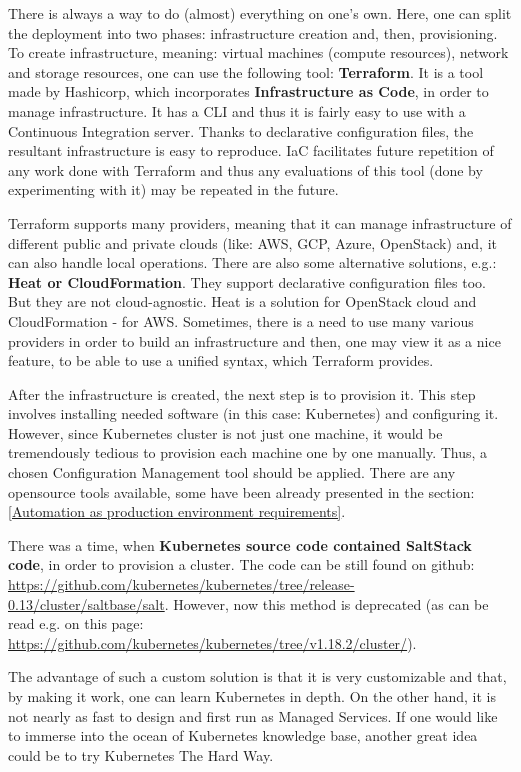 There is always a way to do (almost) everything on one's own. Here, one can split the deployment into two phases: infrastructure creation and, then, provisioning. To create infrastructure, meaning: virtual machines (compute resources), network and storage resources, one can use the following tool: \textbf{Terraform}. It is a tool made by Hashicorp, which incorporates \textbf{Infrastructure as Code}, in order to manage infrastructure. It has a CLI and thus it is fairly easy to use with a Continuous Integration server. Thanks to declarative configuration files, the resultant infrastructure is easy to reproduce\cite{terraform}. IaC facilitates future repetition of any work done with Terraform and thus any evaluations of this tool (done by experimenting with it) may be repeated in the future.

Terraform supports many providers, meaning that it can manage infrastructure of different public and private clouds (like: AWS, GCP, Azure, OpenStack) and, it can also handle local operations\cite{terraform}. There are also some alternative solutions, e.g.: \textbf{Heat or CloudFormation}. They support declarative configuration files too. But they are not cloud-agnostic. Heat is a solution for OpenStack cloud and CloudFormation - for AWS. Sometimes, there is a need to use many various providers in order to build an infrastructure and then, one may view it as a nice feature, to be able to use a unified syntax, which Terraform provides\cite{terraform-vs}.

After the infrastructure is created, the next step is to provision it. This step involves installing needed software (in this case: Kubernetes) and configuring it. However, since Kubernetes cluster is not just one machine, it would be tremendously tedious to provision each machine one by one manually. Thus, a chosen Configuration Management tool should be applied. There are any opensource tools available, some have been already presented in the section: \ref{Automation as production environment requirements}.

There was a time, when \textbf{Kubernetes source code contained SaltStack code}, in order to provision a cluster. The code can be still found on github: \url{https://github.com/kubernetes/kubernetes/tree/release-0.13/cluster/saltbase/salt}. However, now this method is deprecated (as can be read e.g. on this page: \url{https://github.com/kubernetes/kubernetes/tree/v1.18.2/cluster/}).

The advantage of such a custom solution is that it is very customizable and that, by making it work, one can learn Kubernetes in depth. On the other hand, it is not nearly as fast to design and first run as Managed Services. If one would like to immerse into the ocean of Kubernetes knowledge base, another great idea could be to try Kubernetes The Hard Way\cite{k8s-thw}.


